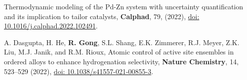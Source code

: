 \begin{etaremune}
Thermodynamic modeling of the Pd-Zn system with uncertainty quantification and its implication to tailor catalysts, 
\textbf{Calphad}, 79, (2022),
\href{https://doi.org/10.1016/j.calphad.2022.102491}{doi: 10.1016/j.calphad.2022.102491}.
\item  A. Dasgupta, H. He, \textbf{R. Gong}, S.L. Shang, E.K. Zimmerer, R.J. Meyer, Z.K. Liu, M.J. Janik, and R.M. Rioux,
Atomic control of active site ensembles in ordered alloys to enhance hydrogenation selectivity, 
\textbf{Nature Chemistry}, 14, 523–529 (2022),
\href{https://doi.org/10.1038/s41557-021-00855-3}{doi: 10.1038/s41557-021-00855-3}.

\end{etaremune}